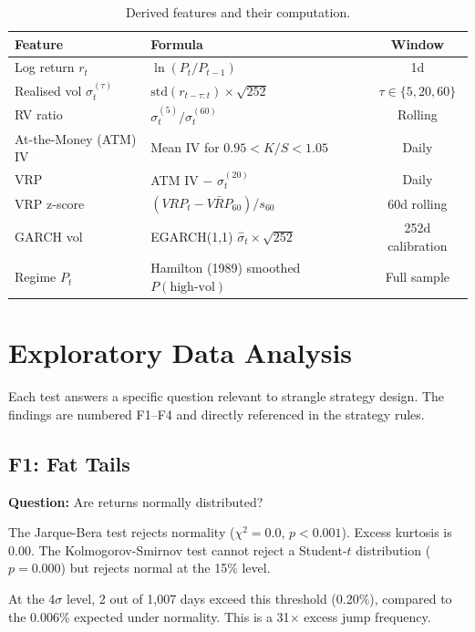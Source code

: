 \documentclass[11pt,a4paper]{article}
\begin{document}
\begin{table}[H]
\centering
\caption{Derived features and their computation.}
\label{tab:features}
\begin{tabular}{llc}
\toprule
Feature & Formula & Window \\
\midrule
Log return $r_t$ & $\ln(P_t/P_{t-1})$ & 1d \\
Realised vol $\sigma^{(\tau)}_t$ & $\text{std}(r_{t-\tau:t}) \times \sqrt{252}$ & $\tau \in \{5,20,60\}$ \\
RV ratio & $\sigma^{(5)}_t / \sigma^{(60)}_t$ & Rolling \\
At-the-Money (ATM) IV & Mean IV for $0.95 < K/S < 1.05$ & Daily \\
VRP & ATM IV $-$ $\sigma^{(20)}_t$ & Daily \\
VRP z-score & $(VRP_t - \bar{VRP}_{60}) / s_{60}$ & 60d rolling \\
GARCH vol & EGARCH(1,1) $\hat{\sigma}_t \times \sqrt{252}$ & 252d calibration \\
Regime $P_t$ & Hamilton (1989) smoothed $P(\text{high-vol})$ & Full sample \\
\bottomrule
\end{tabular}
\end{table}


\section{Exploratory Data Analysis}
\label{sec:eda}

Each test answers a specific question relevant to strangle strategy design. The findings are numbered F1--F4 and directly referenced in the strategy rules.

\subsection{F1: Fat Tails}

\textbf{Question:} Are returns normally distributed?

The Jarque-Bera test rejects normality ($\chi^2 = 0.0$, $p < 0.001$). Excess kurtosis is 0.00. The Kolmogorov-Smirnov test cannot reject a Student-$t$ distribution ($p = 0.000$) but rejects normal at the 15\% level.

At the 4$\sigma$ level, 2 out of 1,007 days exceed this threshold (0.20\%), compared to the 0.006\% expected under normality. This is a 31$\times$ excess jump frequency.
\end{document}
